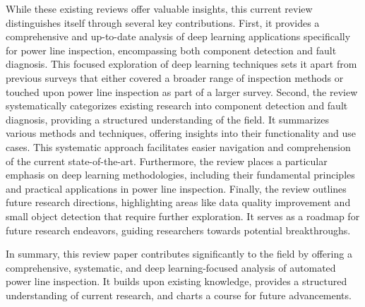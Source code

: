 While these existing reviews offer valuable insights, this current review distinguishes itself through several key contributions. First, it provides a comprehensive and up-to-date analysis of deep learning applications specifically for power line inspection, encompassing both component detection and fault diagnosis. This focused exploration of deep learning techniques sets it apart from previous surveys that either covered a broader range of inspection methods or touched upon power line inspection as part of a larger survey. Second, the review systematically categorizes existing research into component detection and fault diagnosis, providing a structured understanding of the field. It summarizes various methods and techniques, offering insights into their functionality and use cases. This systematic approach facilitates easier navigation and comprehension of the current state-of-the-art. Furthermore, the review places a particular emphasis on deep learning methodologies, including their fundamental principles and practical applications in power line inspection. Finally, the review outlines future research directions, highlighting areas like data quality improvement and small object detection that require further exploration. It serves as a roadmap for future research endeavors, guiding researchers towards potential breakthroughs.

In summary, this review paper contributes significantly to the field by offering a comprehensive, systematic, and deep learning-focused analysis of automated power line inspection. It builds upon existing knowledge, provides a structured understanding of current research, and charts a course for future advancements.